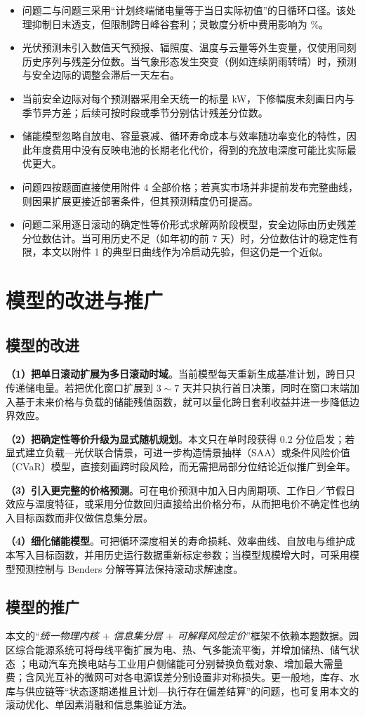 \begin{itemize}[itemsep=2pt, topsep=3pt]
	\item 问题二与问题三采用“计划终端储电量等于当日实际初值”的日循环口径。该处理抑制日末透支，但限制跨日峰谷套利；灵敏度分析中费用影响为 \SensTerminalPct\%。
	\item 光伏预测未引入数值天气预报、辐照度、温度与云量等外生变量，仅使用同刻历史序列与残差分位数。当气象形态发生突变（例如连续阴雨转晴）时，预测与安全边际的调整会滞后一天左右。
	\item 当前安全边际对每个预测器采用全天统一的标量 kW，下修幅度未刻画日内与季节异方差；后续可按时段或季节分别估计残差分位数。
	\item 储能模型忽略自放电、容量衰减、循环寿命成本与效率随功率变化的特性，因此年度费用中没有反映电池的长期老化代价，得到的充放电深度可能比实际最优更大。
	\item 问题四按题面直接使用附件 4 全部价格；若真实市场并非提前发布完整曲线，则因果扩展更接近部署条件，但其预测精度仍可提高。
	\item 问题二采用逐日滚动的确定性等价形式求解两阶段模型，安全边际由历史残差分位数估计。当可用历史不足（如年初的前 $7$ 天）时，分位数估计的稳定性有限，本文以附件 1 的典型日曲线作为冷启动先验，但这仍是一个近似。
\end{itemize}

\section{模型的改进与推广}

\subsection{模型的改进}
\label{sec:improve}

\textbf{（1）把单日滚动扩展为多日滚动时域}。当前模型每天重新生成基准计划，跨日只传递储电量。若把优化窗口扩展到 $3\sim7$ 天并只执行首日决策，同时在窗口末端加入基于未来价格与负载的储能残值函数，就可以量化跨日套利收益并进一步降低边界效应。

\textbf{（2）把确定性等价升级为显式随机规划}。本文只在单时段获得 $0.2$ 分位启发；若显式建立负载—光伏联合情景，可进一步构造情景抽样（SAA）或条件风险价值（CVaR）模型，直接刻画跨时段风险，而无需把局部分位结论近似推广到全年。

\textbf{（3）引入更完整的价格预测}。可在电价预测中加入日内周期项、工作日／节假日效应与温度特征，或采用分位数回归直接给出价格分布，从而把电价不确定性也纳入目标函数而非仅做信息集分层。

\textbf{（4）细化储能模型}。可把循环深度相关的寿命损耗、效率曲线、自放电与维护成本写入目标函数，并用历史运行数据重新标定参数；当模型规模增大时，可采用模型预测控制与 Benders 分解等算法保持滚动求解速度。

\subsection{模型的推广}

本文的“\emph{统一物理内核 $+$ 信息集分层 $+$ 可解释风险定价}”框架不依赖本题数据。园区综合能源系统可将母线平衡扩展为电、热、气多能流平衡，并增加储热、储气状态 \cite{liu2018dayahead}；电动汽车充换电站与工业用户侧储能可分别替换负载对象、增加最大需量费；含风光互补的微网可对各电源误差分别设置非对称损失。更一般地，库存、水库与供应链等“状态逐期递推且计划—执行存在偏差结算”的问题，也可复用本文的滚动优化、单因素消融和信息集验证方法。
